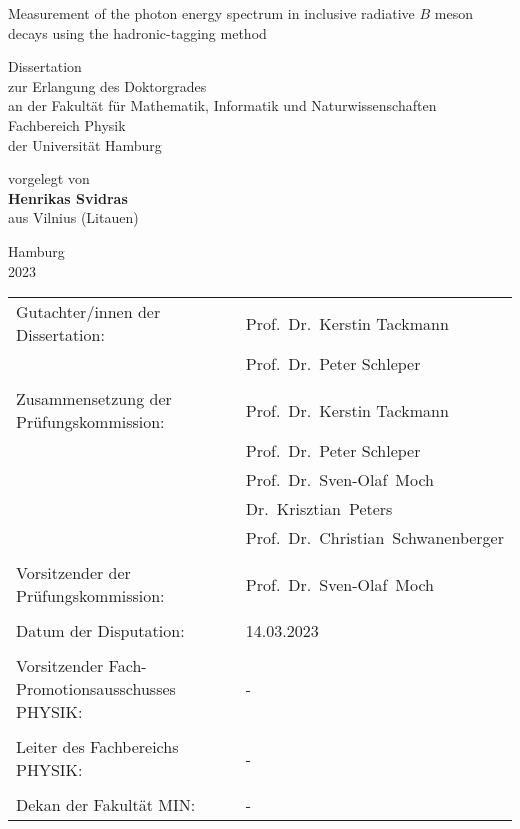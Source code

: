 \thispagestyle{empty}
\begin{center}
\huge{Measurement of the photon energy spectrum in inclusive radiative $B$ meson
decays using the hadronic-tagging method}

\vspace{0.2\textheight}
\large{Dissertation \\ zur Erlangung des Doktorgrades \\ an der Fakult\"at f\"ur Mathematik, Informatik und Naturwissenschaften \\ Fachbereich Physik \\ der Universit\"at Hamburg}

\vspace{0.2\textheight}
\large{vorgelegt von \\ \textbf{Henrikas Svidras} \\ aus Vilnius (Litauen)}

\vspace{0.1\textheight}
\large{Hamburg \\ 2023}
\end{center}

\newpage
\thispagestyle{empty}

\newpage
\thispagestyle{empty}

\vspace*{\fill}

\begin{tabular*}{\textwidth}{l @{\extracolsep{\fill}} l}
Gutachter/innen der Dissertation: & Prof.~Dr.~Kerstin Tackmann  \\
& Prof.~Dr.~Peter Schleper \\
\\
Zusammensetzung der Prüfungskommission: & Prof.~Dr.~Kerstin Tackmann\\
& Prof.~Dr.~Peter Schleper\\
& Prof.~Dr.~Sven-Olaf~Moch \\
& Dr.~Krisztian~Peters  \\
& Prof.~Dr.~Christian~Schwanenberger \\
\\
Vorsitzender der Prüfungskommission: & Prof.~Dr.~Sven-Olaf~Moch \\
\\
Datum der Disputation: & 14.03.2023 \\ %
\\
Vorsitzender Fach-Promotionsausschusses PHYSIK: &  - \\
\\
Leiter des Fachbereichs PHYSIK: & - \\
\\
Dekan der Fakultät MIN: & - \\
\end{tabular*}

\newpage
\thispagestyle{empty}
